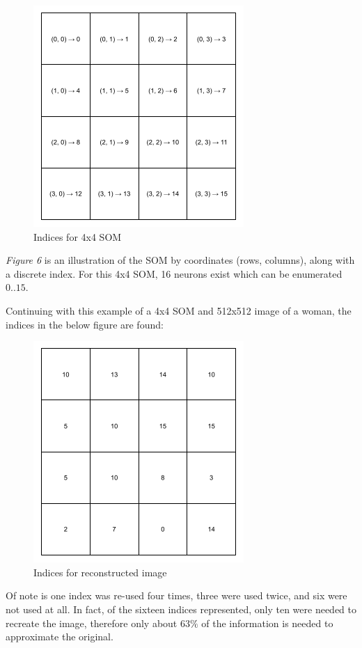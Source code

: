 \documentclass[a4paper,12pt]{article}
\begin{document}
\begin{figure}[h!]
\centering
\includegraphics[scale=0.55]{images/indices.png}
\caption{Indices for 4x4 SOM}
\label{fig:indices}
\end{figure}

\pagebreak

\textit{Figure 6} is an illustration of the SOM by coordinates (rows, columns), along with a discrete index. For this 4x4 SOM, 16 neurons exist which can be enumerated $0..15$.

Continuing with this example of a 4x4 SOM and 512x512 image of a woman, the indices in the below figure are found:

\begin{figure}[h!]
\centering
\includegraphics[scale=0.55]{images/recon_indices.png}
\caption{Indices for reconstructed image}
\label{fig:lindices}
\end{figure}

Of note is one index was re-used four times, three were used twice, and six were not used at all. In fact, of the sixteen indices represented, only ten were needed to recreate the image, therefore only about $63\%$ of the information is needed to approximate the original.
\end{document}
